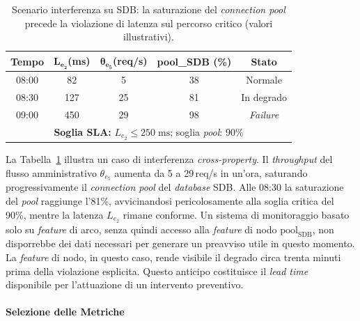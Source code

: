 \begin{table}[htbp]
\centering
\caption{Scenario interferenza su SDB: la saturazione del \textit{connection pool} precede la
violazione di latenza sul percorso critico (valori illustrativi).}
\label{tab:scenario_interferenza}
\begin{tabular}{ccccc}
\toprule
\textbf{Tempo} & $\boldsymbol{L_{e_2}}$\textbf{(ms)} & $\boldsymbol{\theta_{e_5}}$\textbf{(req/s)} & \textbf{pool\_SDB (\%)} & \textbf{Stato} \\
\midrule
08:00 & 82  & 5  & 38 & Normale \\
08:30 & 127 & 25 & 81 & In degrado \\
09:00 & 450 & 29 & 98 & \textit{Failure} \\
\midrule
\multicolumn{5}{c}{\footnotesize\textbf{Soglia \gls{SLA}:} $L_{e_2} \leq 250\;\text{ms}$;\; soglia \textit{pool}: 90\%} \\
\bottomrule
\end{tabular}
\end{table}

La Tabella~\ref{tab:scenario_interferenza} illustra un caso di interferenza \textit{cross-property}.
Il \textit{throughput} del flusso amministrativo $\theta_{e_5}$ aumenta da 5 a 29\,req/s in
un'ora, saturando progressivamente il \textit{connection pool} del \textit{database} SDB. Alle
08:30 la saturazione del \textit{pool} raggiunge l'81\%, avvicinandosi pericolosamente alla soglia
critica del 90\%, mentre la latenza $L_{e_2}$ rimane conforme. Un sistema di monitoraggio basato
solo su \textit{feature} di arco, senza quindi accesso alla \textit{feature} di nodo
$\text{pool}_{\text{SDB}}$, non disporrebbe dei dati necessari per generare un preavviso utile in
questo momento. La \textit{feature} di nodo, in questo caso, rende visibile il degrado circa trenta
minuti prima della violazione esplicita. Questo anticipo costituisce il \textit{lead time}
disponibile per l'attuazione di un intervento preventivo.

\paragraph{Selezione delle Metriche}
\label{sec:selezione_metriche}

